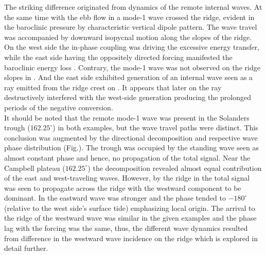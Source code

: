 \documentclass[12pt]{article}
\begin{document}
The striking difference originated from dynamics of the remote internal waves. At the 
same time with the ebb flow in  a mode-1 wave crossed the ridge, evident in the 
baroclinic pressure by characteristic vertical dipole pattern. The wave travel was accompanied by 
downward isopycnal motion along the slopes of the ridge. On the west side the in-phase coupling 
was driving the excessive energy transfer, while the east side having the oppositely directed 
forcing manifested the baroclinic energy loss . Contrary, the mode-1 wave 
was not observed on the ridge slopes in . And the east side exhibited generation of an 
internal wave seen as 
a ray emitted from the ridge crest on . It appears that later on the ray 
destructively interfered with the west-side generation producing the prolonged periods of the 
negative conversion.\\
It should be noted that the remote mode-1 wave was present in the Solanders trough 
($162.25^{\circ}$) in both examples, but the wave travel 
paths were distinct. This conclusion was augmented by the directional decomposition and respective 
wave phase distribution (Fig.). The trough was occupied 
by the standing wave seen as almost constant phase and hence, no propagation of the total signal. 
Near the Campbell plateau ($162.25^{\circ}$) the decomposition revealed almost equal contribution 
of the east and west-traveling waves. However, by the ridge in  the total signal was 
seen to propagate across the ridge with the westward component to be dominant. In  
the eastward wave was stronger and the phase tended to $-180^{\circ}$ (relative to the west side's 
surface tide) emphasizing local origin. The arrival to the ridge of the westward wave was similar 
in the given examples and the phase lag with the forcing was the same, thus, the different wave 
dynamics resulted from difference in the westward wave incidence on the ridge which is explored in 
detail further.\\

\end{document}
